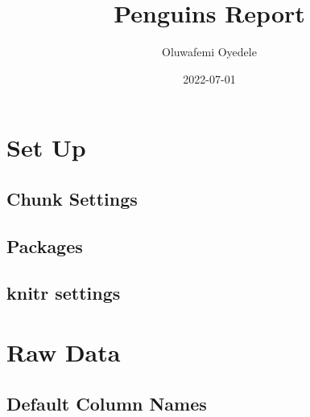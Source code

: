 \documentclass[
  landscape]{article}
\title{Penguins Report}
\author{Oluwafemi Oyedele}
\date{2022-07-01}
\begin{document}
\maketitle

\newpage{}

{
\setcounter{tocdepth}{2}
\tableofcontents
}
\let\oldsection\section
\renewcommand\section{\clearpage\oldsection}

\hypertarget{set-up}{%
\section{Set Up}\label{set-up}}

\hypertarget{chunk-settings}{%
\subsection{Chunk Settings}\label{chunk-settings}}

\hypertarget{packages}{%
\subsection{Packages}\label{packages}}

\hypertarget{knitr-settings}{%
\subsection{knitr settings}\label{knitr-settings}}

\hypertarget{raw-data}{%
\section{Raw Data}\label{raw-data}}

\hypertarget{default-column-names}{%
\subsection{Default Column Names}\label{default-column-names}}
\end{document}
